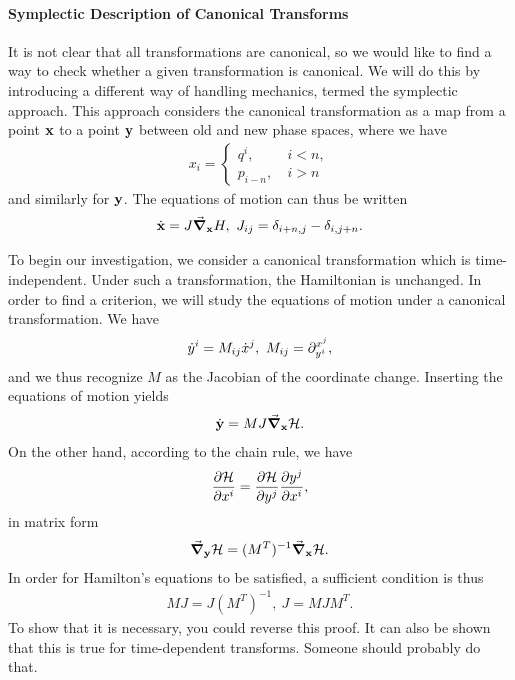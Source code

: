 \paragraph{Symplectic Description of Canonical Transforms}
It is not clear that all transformations are canonical, so we would like to find a way to check whether a given transformation is canonical. We will do this by introducing a different way of handling mechanics, termed the symplectic approach. This approach considers the canonical transformation as a map from a point $\vb{x}$ to a point $\vb{y}$ between old and new phase spaces, where we have
\begin{align*}
	x_{i} =
	\begin{cases}
		q^{i},    \ &i < n, \\
		p_{i - n},\ &i > n
	\end{cases}
\end{align*}
and similarly for $\vb{y}$. The equations of motion can thus be written
\begin{align*}
	\dot{\vb{x}} = J\grad_{\vb{x}}{H},\ J_{ij} = \delta_{i + n, j} - \delta_{i, j + n}.
\end{align*}

To begin our investigation, we consider a canonical transformation which is time-independent. Under such a transformation, the Hamiltonian is unchanged. In order to find a criterion, we will study the equations of motion under a canonical transformation. We have
\begin{align*}
	\dot{y}^{i} = M_{ij}\dot{x}^{j},\ M_{ij} = \partial^{x^{j}}_{y^{i}},
\end{align*}
and we thus recognize $M$ as the Jacobian of the coordinate change. Inserting the equations of motion yields
\begin{align*}
	\dot{\vb{y}} = MJ\grad_{\vb{x}}{\mathcal{H}}.
\end{align*}
On the other hand, according to the chain rule, we have
\begin{align*}
	\pdv{\ensuremath{\mathcal{H}}}{x^{i}} = \pdv{\ensuremath{\mathcal{H}}}{y^{j}}\pdv{y^{j}}{x^{i}},
\end{align*}
in matrix form
\begin{align*}
	\grad_{\vb{y}}{\mathcal{H}} = (M^{T})^{-1}\grad_{\vb{x}}{\mathcal{H}}.
\end{align*}
In order for Hamilton's equations to be satisfied, a sufficient condition is thus
\begin{align*}
	MJ = J(M^{T})^{-1},\ J = MJM^{T}.
\end{align*}
To show that it is necessary, you could reverse this proof. It can also be shown that this is true for time-dependent transforms. Someone should probably do that.

